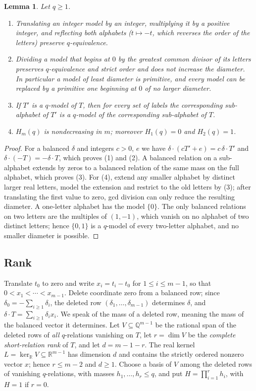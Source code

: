\documentclass[11pt,reqno]{amsart}
\theoremstyle{plain}
\newtheorem{lemma}[theorem]{Lemma}
\theoremstyle{definition}
\theoremstyle{plain}
\newcommand{\R}{\mathbb{R}}
\newcommand{\Q}{\mathbb{Q}}
\theoremstyle{plain}
\theoremstyle{plain}
\theoremstyle{plain}
\theoremstyle{plain}
\theoremstyle{plain}
\theoremstyle{definition}
\theoremstyle{definition}
\theoremstyle{definition}
\theoremstyle{plain}
\begin{document}
\begin{lemma}\label{M-lem:elementary}
Let $q\ge1$.
\begin{enumerate}
\item Translating an integer model by an integer, multiplying it by a positive
 integer, and reflecting both alphabets ($t\mapsto-t$, which reverses the
 order of the letters) preserve $q$-equivalence.
\item Dividing a model that begins at $0$ by the greatest common divisor of
 its letters preserves $q$-equivalence and strict order and does not
 increase the diameter. In particular a model of least diameter is
 primitive, and every model can be replaced by a primitive one beginning at
 $0$ of no larger diameter.
\item If $T'$ is a $q$-model of $T$, then for every set of labels the
 corresponding sub-alphabet of $T'$ is a $q$-model of the corresponding
 sub-alphabet of $T$.
\item $H_m(q)$ is nondecreasing in $m$; moreover $H_1(q)=0$ and $H_2(q)=1$.
\end{enumerate}
\end{lemma}
\begin{proof}
For a balanced $\delta$ and integers $c>0$, $e$ we have
$\delta\cdot(cT'+e)=c\,\delta\cdot T'$ and $\delta\cdot(-T)=-\delta\cdot T$,
which proves (1) and (2). A balanced relation on a sub-alphabet extends by
zeros to a balanced relation of the same mass on the full alphabet, which
proves (3). For (4), extend any smaller alphabet by distinct larger real
letters, model the extension and restrict to the old letters by (3); after
translating the first value to zero, gcd division can only reduce the
resulting diameter. A one-letter alphabet has the model $\{0\}$. The only
balanced relations on two letters are the multiples of $(1,-1)$, which vanish
on no alphabet of two distinct letters; hence $\{0,1\}$ is a $q$-model of
every two-letter alphabet, and no smaller diameter is possible.
\end{proof}

\subsection{Rank}
Translate $t_0$ to zero and write $x_i=t_i-t_0$ for $1\le i\le m-1$, so that
$0<x_1<\cdots<x_{m-1}$. Delete coordinate zero from a balanced row; since
$\delta_0=-\sum_{i\ge1}\delta_i$, the deleted row $(\delta_1,\ldots,\delta_{m-1})$
determines $\delta$, and $\delta\cdot T=\sum_{i\ge1}\delta_ix_i$. We speak of
the mass of a deleted row, meaning the mass of the balanced vector it
determines. Let $V\subseteq\Q^{m-1}$ be the rational span of the deleted rows
of \emph{all} $q$-relations vanishing on $T$, let $r=\dim V$ be the
\emph{complete short-relation rank} of $T$, and let $d=m-1-r$. The real kernel
$L=\ker_\R V\subseteq\R^{m-1}$ has dimension $d$ and contains the strictly
ordered nonzero vector $x$; hence $r\le m-2$ and $d\ge1$. Choose a basis of
$V$ among the deleted rows of vanishing $q$-relations, with masses
$h_1,\ldots,h_r\le q$, and put $H=\prod_{i=1}^rh_i$, with $H=1$ if $r=0$.
\end{document}
